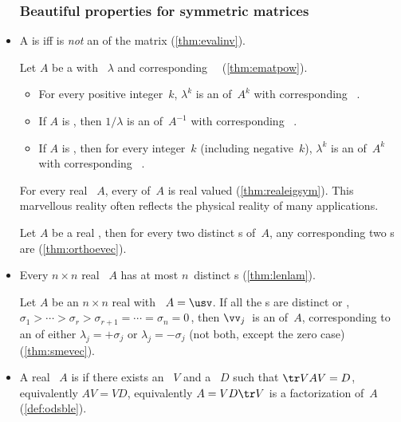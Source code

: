 \begin{itemize}
\subsubsection{Beautiful properties for symmetric matrices}

\item A  is  iff  is \emph{not} an  of the matrix (\cref{thm:evalinv}).

\itemme Let \(A\) be a  with ~\(\lambda\) and corresponding ~\xv\ (\cref{thm:ematpow}).
\begin{itemize}
\item For every positive integer~\(k\), \(\lambda^k\) is an  of~\(A^k\) with corresponding ~\xv.
\item If \(A\) is , then \(1/\lambda\) is an  of~\(A^{-1}\) with corresponding ~\xv.
\item If \(A\) is , then for every integer~\(k\) (including negative~\(k\)), \(\lambda^k\) is an  of~\(A^k\) with corresponding ~\xv.
\end{itemize}

\itemhi For every real ~\(A\), every  of~\(A\) is real valued (\cref{thm:realeigsym}).
This marvellous reality often reflects the physical reality of many applications.

\itemme Let \(A\) be a real , then for every two distinct s of~\(A\), any corresponding two s are  (\cref{thm:orthoevec}).

\item Every \(n\times n\) real ~\(A\) has at most \(n\)~distinct s (\cref{thm:lenlam}).

\itemme Let \(A\) be an \(n\times n\) real  with \svd\ \(A=\usv\).
If all the s are distinct or , \(\sigma_1>\cdots>\sigma_r>\sigma_{r+1}=\cdots=\sigma_n=0\)\,, then \(\vv_j\)~is an  of~\(A\), corresponding to an  of either \(\lambda_j=+\sigma_j\) or \(\lambda_j=-\sigma_j\) (not both, except the zero case)  (\cref{thm:smevec}).

\item A real ~\(A\) is  if there exists an ~\(V\) and a ~\(D\) such that \(\tr VAV=D\), equivalently \(AV=VD\), equivalently \(A=VD\tr V\) is a factorization of~\(A\) (\cref{def:odsble}).


\end{itemize}

